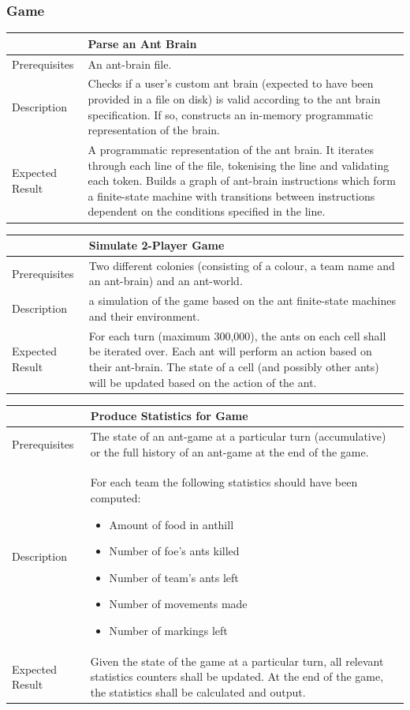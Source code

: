\documentclass[11pt]{article}
\providecommand{\tightlist}{%
  \setlength{\itemsep}{0pt}\setlength{\parskip}{0pt}}
\begin{document}
\subsubsection{Game}\label{game}

\begin{longtable}[c]{@{}p{}p{}@{}}
\toprule
& Parse an Ant Brain \tabularnewline
\midrule
Prerequisites & An ant-brain file. \tabularnewline
Description & Checks if a user's custom ant brain (expected to have
been provided in a file on disk) is valid according to the ant brain
specification. If so, constructs an in-memory programmatic
representation of the brain. \tabularnewline
Expected Result & A programmatic representation of the ant brain. It
iterates through each line of the file, tokenising the line and
validating each token. Builds a graph of ant-brain instructions which
form a finite-state machine with transitions between instructions
dependent on the conditions specified in the line. \tabularnewline
\bottomrule
\end{longtable}

\begin{longtable}[c]{@{}p{}p{}@{}}
\toprule
& Simulate 2-Player Game \tabularnewline
\midrule
Prerequisites & Two different colonies (consisting of a colour, a team
name and an ant-brain) and an ant-world. \tabularnewline
Description & a simulation of the game based on the ant finite-state
machines and their environment. \tabularnewline
Expected Result & For each turn (maximum 300,000), the ants on each cell
shall be iterated over. Each ant will perform an action based on their
ant-brain. The state of a cell (and possibly other ants) will be updated
based on the action of the ant. \tabularnewline
\bottomrule
\end{longtable}

\begin{longtable}[c]{@{}p{}p{}@{}}
\toprule
& Produce Statistics for Game \tabularnewline
\midrule
Prerequisites & The state of an ant-game at a particular turn
(accumulative) or the full history of an ant-game at the end of the
game. \tabularnewline
Description & For each team the following statistics should have been
computed: \begin{itemize}
\tightlist
\item
  Amount of food in anthill
\item
  Number of foe's ants killed
\item
  Number of team's ants left
\item
  Number of movements made
\item
  Number of markings left
\end{itemize} \tabularnewline
Expected Result & Given the state of the game at a particular turn, all
relevant statistics counters shall be updated. At the end of the game,
the statistics shall be calculated and output. \tabularnewline
\bottomrule
\end{longtable}
\end{document}
